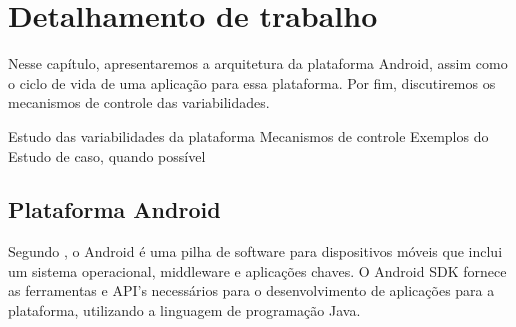 
\chapter{Detalhamento de trabalho}

Nesse capítulo, apresentaremos a arquitetura da plataforma Android, assim como o
ciclo de vida de uma aplicação para essa plataforma. Por fim, discutiremos os 
mecanismos de controle das variabilidades.

 Estudo das variabilidades da plataforma
 Mecanismos de controle
 Exemplos do Estudo de caso, quando possível

\section{Plataforma Android}
Segundo \cite{whatisandroid}, o Android é uma pilha de software para dispositivos
móveis que inclui um sistema operacional, middleware e aplicações chaves. O Android
SDK fornece as ferramentas e API's necessários para o desenvolvimento de aplicações
para a plataforma, utilizando a linguagem de programação Java.

